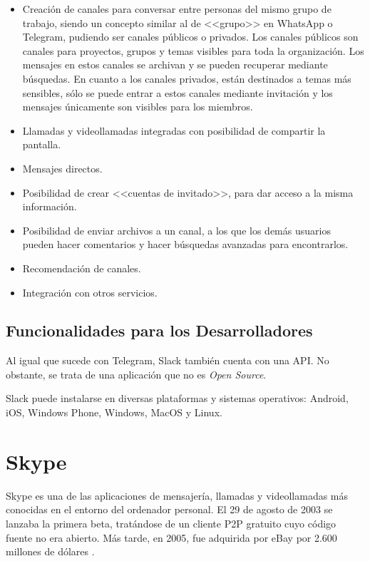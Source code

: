 \begin{itemize}
	\item Creación de canales para conversar entre personas del mismo grupo de trabajo, siendo un concepto similar al de <<grupo>> en WhatsApp o Telegram, pudiendo ser canales públicos o privados. Los canales públicos son canales para proyectos, grupos y temas visibles para toda la organización. Los mensajes en estos canales se archivan y se pueden recuperar mediante búsquedas. En cuanto a los canales privados, están destinados a temas más sensibles, sólo se puede entrar a estos canales mediante invitación y los mensajes únicamente son visibles para los miembros.

	\item Llamadas y videollamadas integradas con posibilidad de compartir la pantalla.
	\item Mensajes directos.
	\item Posibilidad de crear <<cuentas de invitado>>, para dar acceso a la misma información.
	\item Posibilidad de enviar archivos a un canal, a los que los demás usuarios pueden hacer comentarios y hacer búsquedas avanzadas para encontrarlos.
	\item Recomendación de canales.
	\item Integración con otros servicios.
\end{itemize}

\subsection{Funcionalidades para los Desarrolladores}
Al igual que sucede con Telegram, Slack también cuenta con una \acs{API}. No obstante, se trata de una aplicación que no es \textit{Open Source}.

Slack puede instalarse en diversas plataformas y sistemas operativos: Android, iOS, Windows Phone, Windows, MacOS y Linux.

\newpage

\section{Skype}
\label{sec:skype}

Skype es una de las aplicaciones de mensajería, llamadas y videollamadas más conocidas en el entorno del ordenador personal.
El 29 de agosto de 2003 se lanzaba la primera beta, tratándose de un cliente \acf{P2P} gratuito cuyo código fuente no era abierto. Más tarde, en 2005, fue adquirida por eBay por 2.600 millones de dólares \cite{Velasco2013}.

